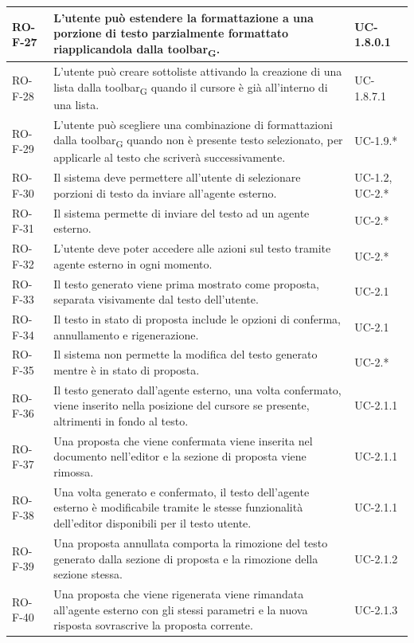 \documentclass[11pt,a4paper]{article}
\newcommand{\gls}[1]{#1\textsubscript{G}}
\begin{document}
\begin{longtable}{|p{}|>{\raggedright\arraybackslash}p{}|p{}|}
\hline
RO-F-27 & L'utente può estendere la formattazione a una porzione di testo parzialmente formattato riapplicandola dalla \gls{toolbar}. & UC-1.8.0.1 \\
\hline
RO-F-28 & L'utente può creare sottoliste attivando la creazione di una lista dalla \gls{toolbar} quando il cursore è già all'interno di una lista. & UC-1.8.7.1 \\
\hline
RO-F-29 & L'utente può scegliere una combinazione di formattazioni dalla \gls{toolbar} quando non è presente testo selezionato, per applicarle al testo che scriverà successivamente. & UC-1.9.* \\
\hline
RO-F-30 & Il sistema deve permettere all'utente di selezionare porzioni di testo da inviare all'agente esterno. & UC-1.2, UC-2.* \\
\hline
RO-F-31 & Il sistema permette di inviare del testo ad un agente esterno. & UC-2.* \\
\hline
RO-F-32 & L'utente deve poter accedere alle azioni sul testo tramite agente esterno in ogni momento. & UC-2.* \\
\hline
RO-F-33 & Il testo generato viene prima mostrato come proposta, separata visivamente dal testo dell'utente. & UC-2.1 \\
\hline
RO-F-34 & Il testo in stato di proposta include le opzioni di conferma, annullamento e rigenerazione. & UC-2.1 \\
\hline
RO-F-35 & Il sistema non permette la modifica del testo generato mentre è in stato di proposta. & UC-2.* \\
\hline
RO-F-36 & Il testo generato dall'agente esterno, una volta confermato, viene inserito nella posizione del cursore se presente, altrimenti in fondo al testo. & UC-2.1.1 \\
\hline
RO-F-37 & Una proposta che viene confermata viene inserita nel documento nell'editor e la sezione di proposta viene rimossa. & UC-2.1.1 \\
\hline
RO-F-38 & Una volta generato e confermato, il testo dell'agente esterno è modificabile tramite le stesse funzionalità dell'editor disponibili per il testo utente. & UC-2.1.1 \\
\hline
RO-F-39 & Una proposta annullata comporta la rimozione del testo generato dalla sezione di proposta e la rimozione della sezione stessa. & UC-2.1.2 \\
\hline
RO-F-40 & Una proposta che viene rigenerata viene rimandata all'agente esterno con gli stessi parametri e la nuova risposta sovrascrive la proposta corrente. & UC-2.1.3 \\

\end{longtable}
\end{document}
